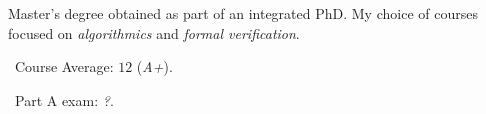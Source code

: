 Master's degree obtained as part of an integrated PhD. My choice of courses
focused on \emph{algorithmics} and \emph{formal verification}.

\medskip

\faFileO\ Course Average: $12$ (\emph{A+}).

\faFileO\ Part A exam: \emph{?}.
